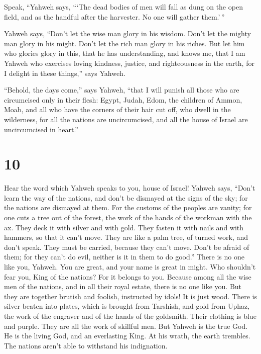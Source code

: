  Speak, ``Yahweh says, ```The dead bodies of men will fall
as dung on the open field, and as the handful after the harvester. No
one will gather them.'\,''

 Yahweh says, ``Don't let the wise man glory in his wisdom.
Don't let the mighty man glory in his might. Don't let the rich man
glory in his riches.  But let him who glories glory in
this, that he has understanding, and knows me, that I am Yahweh who
exercises loving kindness, justice, and righteousness in the earth, for
I delight in these things,'' says Yahweh.

 ``Behold, the days come,'' says Yahweh, ``that I will
punish all those who are circumcised only in their flesh: 
Egypt, Judah, Edom, the children of Ammon, Moab, and all who have the
corners of their hair cut off, who dwell in the wilderness, for all the
nations are uncircumcised, and all the house of Israel are uncircumcised
in heart.''

\hypertarget{section-9}{%
\section{10}\label{section-9}}

 Hear the word which Yahweh speaks to you, house of Israel!
 Yahweh says, ``Don't learn the way of the nations, and
don't be dismayed at the signs of the sky; for the nations are dismayed
at them.  For the customs of the peoples are vanity; for one
cuts a tree out of the forest, the work of the hands of the workman with
the ax.  They deck it with silver and with gold. They fasten
it with nails and with hammers, so that it can't move.  They
are like a palm tree, of turned work, and don't speak. They must be
carried, because they can't move. Don't be afraid of them; for they
can't do evil, neither is it in them to do good.''  There is
no one like you, Yahweh. You are great, and your name is great in might.
 Who shouldn't fear you, King of the nations? For it belongs
to you. Because among all the wise men of the nations, and in all their
royal estate, there is no one like you.  But they are
together brutish and foolish, instructed by idols! It is just wood.
 There is silver beaten into plates, which is brought from
Tarshish, and gold from Uphaz, the work of the engraver and of the hands
of the goldsmith. Their clothing is blue and purple. They are all the
work of skillful men.  But Yahweh is the true God. He is
the living God, and an everlasting King. At his wrath, the earth
trembles. The nations aren't able to withstand his indignation.

